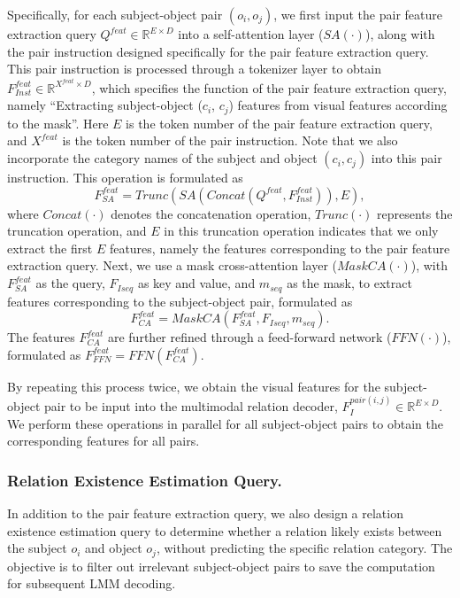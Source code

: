 Specifically, for each subject-object pair $(o_i, o_j)$, we first input the pair feature extraction query $Q^{feat} \in \mathbb{R}^{E \times D}$ into a self-attention layer ($SA(\cdot)$), along with the pair instruction designed specifically for the pair feature extraction query.
This pair instruction is processed through a tokenizer layer to obtain $F_{Inst}^{feat} \in \mathbb{R}^{X^{feat} \times D}$, which specifies the function of the pair feature extraction query, namely ``Extracting subject-object ($c_i$, $c_j$) features from visual features according to the mask''.
Here $E$ is the token number of the pair feature extraction query, and $X^{feat}$ is the token number of the pair instruction.
Note that we also incorporate the category names of the subject and object $(c_i, c_j)$ into this pair instruction.
This operation is formulated as
\begin{equation}
    F_{SA}^{feat} = Trunc(SA(Concat(Q^{feat}, F_{Inst}^{feat})), E),
\end{equation}
where $Concat(\cdot)$ denotes the concatenation operation, $Trunc(\cdot)$ represents the truncation operation, and $E$ in this truncation operation indicates that we only extract the first $E$ features, namely the features corresponding to the pair feature extraction query.
Next, we use a mask cross-attention layer ($MaskCA(\cdot)$), with $F_{SA}^{feat}$ as the query, $F_{Iseq}$ as key and value, and $m_{seq}$ as the mask, to extract features corresponding to the subject-object pair, formulated as
\begin{equation}
    F_{CA}^{feat} = MaskCA(F_{SA}^{feat}, F_{Iseq}, m_{seq}).
\end{equation}
The features $F_{CA}^{feat}$ are further refined through a feed-forward network ($FFN(\cdot)$), formulated as
$F_{FFN}^{feat} = FFN(F_{CA}^{feat})$.

By repeating this process twice, we obtain the visual features for the subject-object pair to be input into the multimodal relation decoder, $F_{I}^{pair(i,j)} \in \mathbb{R}^{E \times D}$.
We perform these operations in parallel for all subject-object pairs to obtain the corresponding features for all pairs.

\subsubsection{Relation Existence Estimation Query.}
In addition to the pair feature extraction query, we also design a relation existence estimation query to determine whether a relation likely exists between the subject $o_i$ and object $o_j$, without predicting the specific relation category.
The objective is to filter out irrelevant subject-object pairs to save the computation for subsequent LMM decoding.

